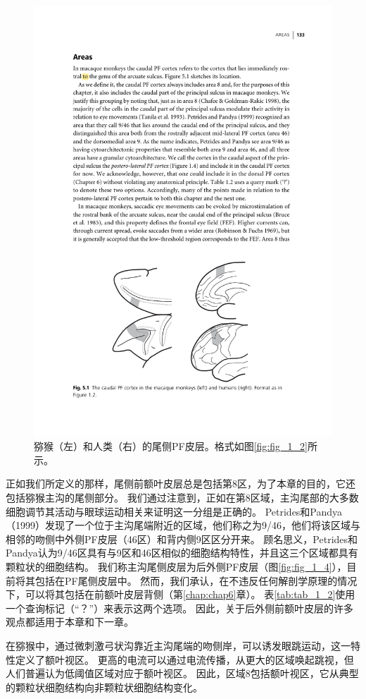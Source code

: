 \begin{figure}
	\centering
	\includegraphics[width=0.7\linewidth]{image_pfc/Fig_5_1}
	\caption{猕猴（左）和人类（右）的尾侧PF皮层。格式如图\ref{fig:fig_1_2}所示。}
	\label{fig:fig_5_1}
\end{figure}


正如我们所定义的那样，尾侧前额叶皮层总是包括第8区，为了本章的目的，它还包括猕猴主沟的尾侧部分。
我们通过注意到，正如在第8区域\cite{Chafee & Goldman-Rakic 1998}，主沟尾部的大多数细胞调节其活动与眼球运动相关\cite{Tanila et al. 1993}来证明这一分组是正确的。
Petrides和Pandya（1999）发现了一个位于主沟尾端附近的区域，他们称之为9/46，他们将该区域与相邻的吻侧中外侧PF皮层（46区）和背内侧9区区分开来。
顾名思义，Petrides和Pandya认为9/46区具有与9区和46区相似的细胞结构特性，并且这三个区域都具有颗粒状的细胞结构。
我们称主沟尾侧皮层为后外侧PF皮层（图\ref{fig:fig_1_4}），目前将其包括在PF尾侧皮层中。
然而，我们承认，在不违反任何解剖学原理的情况下，可以将其包括在前额叶皮层背侧（第\ref{chap:chap6}章）。
表\ref{tab:tab_1_2}使用一个查询标记（“？”）来表示这两个选项。
因此，关于后外侧前额叶皮层的许多观点都适用于本章和下一章。


在猕猴中，通过微刺激弓状沟靠近主沟尾端的吻侧岸，可以诱发眼跳运动\cite{Bruce et al. 1985}，这一特性定义了额叶视区。
更高的电流可以通过电流传播，从更大的区域唤起跳视\cite{Robinson & Fuchs 1969}，但人们普遍认为低阈值区域对应于额叶视区。
因此，区域8包括额叶视区，它从典型的颗粒状细胞结构向非颗粒状细胞结构变化\cite{Stanton et al. 1989}。


